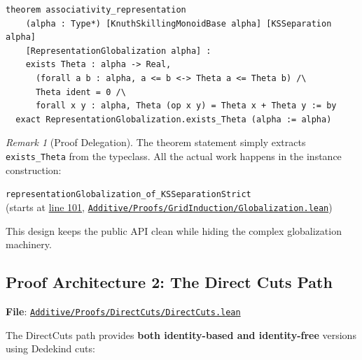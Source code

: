 \documentclass[11pt]{article}
\theoremstyle{definition}
\theoremstyle{remark}
\newtheorem{remark}[theorem]{Remark}
\begin{document}
\begin{lstlisting}[caption={Appendix A Representation Theorem (public API)}]
theorem associativity_representation
    (alpha : Type*) [KnuthSkillingMonoidBase alpha] [KSSeparation alpha]
    [RepresentationGlobalization alpha] :
    exists Theta : alpha -> Real,
      (forall a b : alpha, a <= b <-> Theta a <= Theta b) /\
      Theta ident = 0 /\
      forall x y : alpha, Theta (op x y) = Theta x + Theta y := by
  exact RepresentationGlobalization.exists_Theta (alpha := alpha)
\end{lstlisting}

\begin{remark}[Proof Delegation]
The theorem statement simply extracts \texttt{exists\_Theta} from the typeclass.
All the actual work happens in the instance construction:

\texttt{representationGlobalization\_of\_KSSeparationStrict}
\\
(starts at \href{https://github.com/zariuq/ks-foundations-of-inference/blob/main/KnuthSkilling/Additive/Proofs/GridInduction/Globalization.lean\#L101}{line 101}, \href{https://github.com/zariuq/ks-foundations-of-inference/blob/main/KnuthSkilling/Additive/Proofs/GridInduction/Globalization.lean}{\texttt{Additive/Proofs/GridInduction/Globalization.lean}})

This design keeps the public API clean while hiding the complex globalization machinery.
\end{remark}

\subsection{Proof Architecture 2: The Direct Cuts Path}

\textbf{File}: \href{https://github.com/zariuq/ks-foundations-of-inference/blob/main/KnuthSkilling/Additive/Proofs/DirectCuts/DirectCuts.lean}{\texttt{Additive/Proofs/DirectCuts/DirectCuts.lean}}

The DirectCuts path provides \textbf{both identity-based and identity-free} versions using Dedekind cuts:
\end{document}
